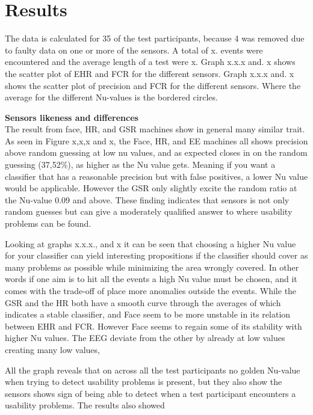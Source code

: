 \section{Results}
The data is calculated for 35 of the test participants, because 4 was removed due to faulty data on one or more of the sensors.	
A total of x. events were encountered and the average length of a test were x.
Graph x.x.x and. x shows the scatter plot of EHR and FCR for the different sensors. 
Graph x.x.x and. x shows the scatter plot of precision and FCR for the different sensors. Where the average for the different Nu-values is the bordered circles.


\textbf{Sensors likeness and differences}\\
The result from face, HR, and GSR machines show in general many similar trait.
As seen in Figure x,x,x and x, the Face, HR, and EE machines all shows precision above random guessing at low nu values, and as expected closes in on the random guessing (37,52\%), as higher as the Nu value gets. Meaning if you want a classifier that has a reasonable precision but with false positives, a lower Nu value would be applicable. However the GSR only slightly excite the random ratio at the Nu-value 0.09 and above.
These finding indicates that sensors is not only random guesses but can give a moderately qualified answer to where usability problems can be found.

Looking at graphs x.x.x., and x it can be seen that choosing a higher Nu value for your classifier can yield interesting propositions if the classifier should cover as many problems as possible while minimizing the area wrongly covered.
In other words if one aim is to hit all the events a high Nu value must be chosen, and it comes with the trade-off of place more anomalies outside the events. 
While the GSR and the HR both have a smooth curve through the averages of which indicates a stable classifier, and Face seem to be more unstable in its relation between EHR and FCR. However Face seems to regain some of its stability with higher Nu values. The EEG deviate from the other by already at low values creating many low values, 

All the graph reveals that on across all the test participants no golden Nu-value when trying to detect usability problems is present, but they also show the sensors shows sign of being able to detect when a test participant encounters a usability problems.
The results also showed 
